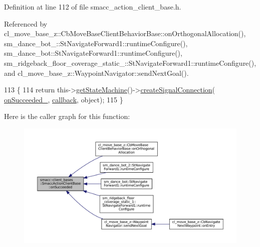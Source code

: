 Definition at line 112 of file smacc\+\_\+action\+\_\+client\+\_\+base.\+h.



Referenced by cl\+\_\+move\+\_\+base\+\_\+z\+::\+Cb\+Move\+Base\+Client\+Behavior\+Base\+::on\+Orthogonal\+Allocation(), sm\+\_\+dance\+\_\+bot\+\_\+::\+St\+Navigate\+Forward1\+::runtime\+Configure(), sm\+\_\+dance\+\_\+bot\+::\+St\+Navigate\+Forward1\+::runtime\+Configure(), sm\+\_\+ridgeback\+\_\+floor\+\_\+coverage\+\_\+static\+\_\+::\+St\+Navigate\+Forward1\+::runtime\+Configure(), and cl\+\_\+move\+\_\+base\+\_\+z\+::\+Waypoint\+Navigator\+::send\+Next\+Goal().


\begin{DoxyCode}
113     \{
114         \textcolor{keywordflow}{return} this->\hyperlink{classsmacc_1_1ISmaccClient_aec51d4712404cb9882b86e4c854bb93a}{getStateMachine}()->\hyperlink{classsmacc_1_1ISmaccStateMachine_adf0f42ade0c65cc471960fe2a7c42da2}{createSignalConnection}(
      \hyperlink{classsmacc_1_1client__bases_1_1SmaccActionClientBase_afa1d615e16c9e825d815a3a3ccaa61df}{onSucceeded\_}, \hyperlink{sm__ridgeback__barrel__search__1_2servers_2opencv__perception__node_2opencv__perception__node_8cpp_a050e697bd654facce10ea3f6549669b3}{callback}, \textcolor{keywordtype}{object});
115     \}
\end{DoxyCode}
Here is the caller graph for this function\+:
\nopagebreak
\begin{figure}[H]
\begin{center}
\leavevmode
\includegraphics[width=350pt]{classsmacc_1_1client__bases_1_1SmaccActionClientBase_af6d77c27d21b2e4f621f53c5f1df088b_icgraph}
\end{center}
\end{figure}
\mbox{\label{classsmacc_1_1client__bases_1_1SmaccActionClientBase_a92053df4ebfd0e49bbbd4ba191bf3975}} 

